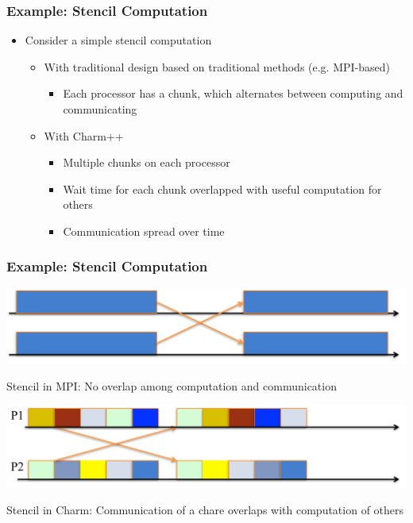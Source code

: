\begin{frame}[t]
\frametitle{Example: Stencil Computation}
  \begin{itemize}
    \item Consider a simple stencil computation
    \begin{itemize}
      \item With traditional design based on traditional methods (e.g.  MPI-based)
      \begin{itemize}
        \item Each processor has a chunk, which alternates between computing and communicating
      \end{itemize}
      \pause
      \item With Charm++
      \begin{itemize}
        \item Multiple chunks on each processor
        \item Wait time for each chunk overlapped with useful computation for others
        \item Communication spread over time
      \end{itemize}
    \end{itemize}
  \end{itemize}
\end{frame}

\begin{frame}[t]
\frametitle{Example: Stencil Computation}
  \begin{center} \includegraphics[width=\textwidth]{figures/stencil_timeline} \end{center}
  \begin{center} Stencil in MPI: No overlap among computation and
  communication\end{center}
  \pause
  \begin{center} \includegraphics[width=\textwidth]{figures/stencil_timeline2} \end{center}
  \begin{center} Stencil in Charm: Communication of a chare overlaps with
  computation of others \end{center}
\end{frame}

